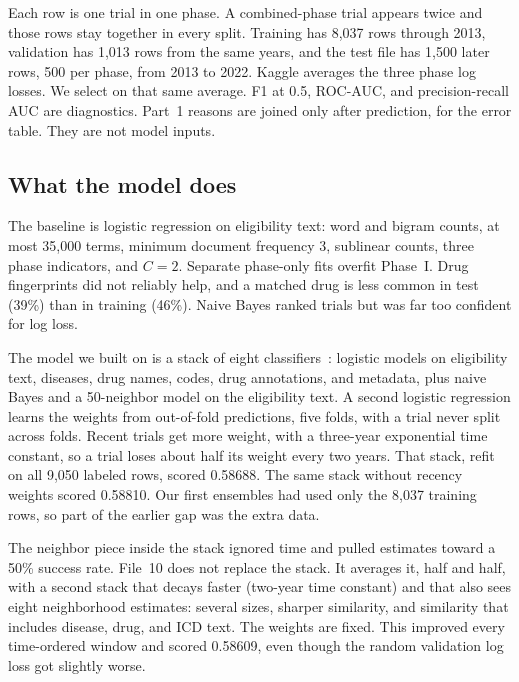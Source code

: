 \documentclass[10pt,twocolumn,letterpaper]{article}
\begin{document}
Each row is one trial in one phase. A combined-phase trial appears twice and
those rows stay together in every split. Training has 8,037 rows through 2013,
validation has 1,013 rows from the same years, and the test file has 1,500
later rows, 500 per phase, from 2013 to 2022. Kaggle averages the three phase
log losses. We select on that same average. F1 at 0.5, ROC-AUC, and
precision-recall AUC are diagnostics. Part~1 reasons are joined only after
prediction, for the error table. They are not model inputs.

\subsection{What the model does}

The baseline is logistic regression on eligibility text: word and bigram
counts, at most 35,000 terms, minimum document frequency 3, sublinear counts,
three phase indicators, and $C = 2$. Separate phase-only fits overfit Phase~I.
Drug fingerprints did not reliably help, and a matched drug is less common in
test (39\%) than in training (46\%). Naive Bayes ranked trials but was far too
confident for log loss.

The model we built on is a stack of eight classifiers~\cite{wolpert1992stacked}:
logistic models on eligibility text, diseases, drug names, codes, drug
annotations, and metadata, plus naive Bayes and a 50-neighbor model on the
eligibility text. A second logistic regression learns the weights from
out-of-fold predictions, five folds, with a trial never split across folds.
Recent trials get more weight, with a three-year exponential time constant, so
a trial loses about half its weight every two years. That stack, refit on all
9,050 labeled rows, scored 0.58688. The same stack without recency weights
scored 0.58810. Our first ensembles had used only the 8,037 training rows, so
part of the earlier gap was the extra data.

The neighbor piece inside the stack ignored time and pulled estimates toward a
50\% success rate. File~10 does not replace the stack. It averages it, half and
half, with a second stack that decays faster (two-year time constant) and that
also sees eight neighborhood estimates: several sizes, sharper similarity, and
similarity that includes disease, drug, and ICD text. The weights are fixed.
This improved every time-ordered window and scored 0.58609, even though the
random validation log loss got slightly worse.
\end{document}
